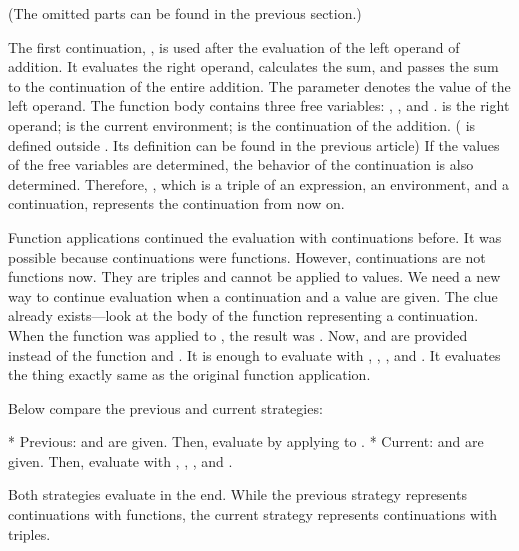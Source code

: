(The omitted parts can be found in the previous section.)

The first continuation, , is used after the evaluation of the left operand of addition. It
evaluates the right operand, calculates the sum, and passes the sum to the
continuation of the entire addition. The parameter  denotes the value of
the left operand. The function body contains three free variables: ,
, and .  is the right operand;  is the
current environment;  is the continuation of the addition.
( is defined outside . Its definition can be found in
the previous article) If the values of the free variables are determined, the
behavior of the continuation is also determined. Therefore, ,
which is a triple of an expression, an environment, and a continuation,
represents the continuation from now on.

Function applications continued the evaluation with continuations before. It was
possible because continuations were functions. However, continuations are not
functions now. They are triples and cannot be applied to values. We need a new
way to continue evaluation when a continuation and a value are given. The clue
already exists---look at the body of the function representing a continuation.
When the function was applied to , the result was . Now,  and  are
provided instead of the function and . It is enough to evaluate
 with ,
, , and . It evaluates the thing exactly same as the
original function application.

Below compare the previous and current strategies:

* Previous:  and
 are given. Then, evaluate  by applying  to .
* Current:  and  are given. Then, evaluate
 with ,
, , and .

Both strategies evaluate  in the end. While the previous strategy represents continuations with
functions, the current strategy represents continuations with triples.

